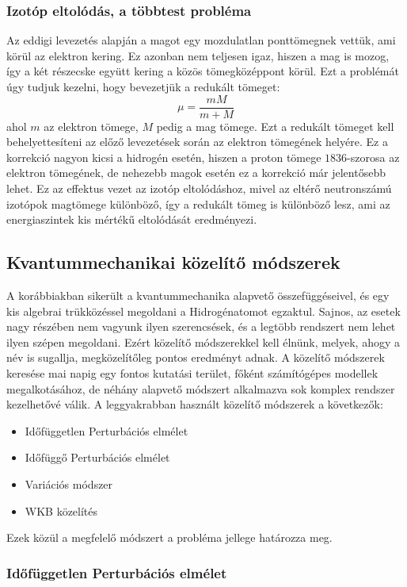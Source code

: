 \documentclass[../main.tex]{subfiles}
\begin{document}
\subsubsection{Izotóp eltolódás, a többtest probléma}
Az eddigi levezetés alapján a magot egy mozdulatlan ponttömegnek vettük, ami körül az elektron kering. Ez azonban nem teljesen igaz, hiszen a mag is mozog, így a két részecske
együtt kering a közös tömegközéppont körül. Ezt a problémát úgy tudjuk kezelni, hogy bevezetjük a redukált tömeget:
\begin{equation}
    \mu = \frac{m M}{m + M}
\end{equation}
ahol $m$ az elektron tömege, $M$ pedig a mag tömege. Ezt a redukált tömeget kell behelyettesíteni az előző levezetések során az elektron tömegének helyére. Ez a korrekció
nagyon kicsi a hidrogén esetén, hiszen a proton tömege $1836$-szorosa az elektron tömegének, de nehezebb magok esetén ez a korrekció már jelentősebb lehet. Ez az effektus vezet az izotóp eltolódáshoz,
mivel az eltérő neutronszámú izotópok magtömege különböző, így a redukált tömeg is különböző lesz, ami az energiaszintek kis mértékű eltolódását eredményezi.

\subsection{Kvantummechanikai közelítő módszerek}
A korábbiakban sikerült a kvantummechanika alapvető összefüggéseivel, és egy kis algebrai trükközéssel megoldani a Hidrogénatomot egzaktul. Sajnos, az esetek nagy részében nem vagyunk ilyen szerencsések,
és a legtöbb rendszert nem lehet ilyen szépen megoldani. Ezért közelítő módszerekkel kell élnünk, melyek, ahogy a név is sugallja, megközelítőleg pontos eredményt adnak. A közelítő módszerek keresése
mai napig egy fontos kutatási terület, főként számítógépes modellek megalkotásához, de néhány alapvető módszert alkalmazva sok komplex rendszer kezelhetővé válik. A leggyakrabban használt közelítő módszerek a következők:
\begin{itemize}
    \item Időfüggetlen Perturbációs elmélet
    \item Időfüggő Perturbációs elmélet
    \item Variációs módszer
    \item WKB közelítés
\end{itemize}
Ezek közül a megfelelő módszert a probléma jellege határozza meg.

\subsubsection{Időfüggetlen Perturbációs elmélet}
\end{document}
